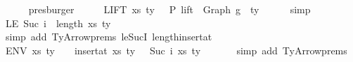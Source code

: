 \begin{isabellebody}
\ \ \ \ \isamarkupfalse%
\ presburger\isanewline
\ \ \isamarkupfalse%
\ \isamarkupfalse%
\ LIFT{\isacharcolon}{\kern0pt}\ {\isachardoublequoteopen}{\isacharparenleft}{\kern0pt}xs{\isacharprime}{\kern0pt}{\isacharcomma}{\kern0pt}\ ty{}{\isacharprime}{\kern0pt}{\isacharparenright}{\kern0pt}\ {\isacharhash}{\kern0pt}\ {\isasymGamma}{}\ {\isasymturnstile}{\isacharbraceleft}{\kern0pt}P{\isacharbraceright}{\kern0pt}\ {\isacharparenleft}{\kern0pt}lift\ {}\ {\isacharparenleft}{\kern0pt}Graph\ g{}{\isacharparenright}{\kern0pt}{\isacharparenright}{\kern0pt}\ {\isacharcolon}{\kern0pt}\ ty{}{\isachardoublequoteclose}\isanewline
\ \ \ \ \isamarkupfalse%
\ simp\isanewline
\isanewline
\ \ \isamarkupfalse%
\ LE{\isacharcolon}{\kern0pt}\ {\isachardoublequoteopen}Suc\ i\ {\isasymle}\ length\ {\isacharparenleft}{\kern0pt}{\isacharparenleft}{\kern0pt}xs{\isacharprime}{\kern0pt}{\isacharcomma}{\kern0pt}\ ty{}{\isacharprime}{\kern0pt}{\isacharparenright}{\kern0pt}\ {\isacharhash}{\kern0pt}\ {\isasymGamma}{}{\isacharparenright}{\kern0pt}{\isachardoublequoteclose}\isanewline
\ \ \ \ \ \isamarkupfalse%
\ {\isacharparenleft}{\kern0pt}simp\ add{\isacharcolon}{\kern0pt}\ TyArrow{\isachardot}{\kern0pt}prems{\isacharparenleft}{\kern0pt}{}{\isacharcomma}{\kern0pt}{}{\isacharparenright}{\kern0pt}\ le{\isacharunderscore}{\kern0pt}SucI\ length{\isacharunderscore}{\kern0pt}insert{\isacharunderscore}{\kern0pt}at{\isacharparenright}{\kern0pt}\isanewline
\ \ \isamarkupfalse%
\ ENV{\isacharcolon}{\kern0pt}\ {\isachardoublequoteopen}{\isacharparenleft}{\kern0pt}xs{\isacharprime}{\kern0pt}{\isacharcomma}{\kern0pt}\ ty{}{\isacharprime}{\kern0pt}{\isacharparenright}{\kern0pt}\ {\isacharhash}{\kern0pt}\ {\isasymGamma}{\isacharprime}{\kern0pt}\ {\isacharequal}{\kern0pt}\ insert{\isacharunderscore}{\kern0pt}at\ {\isacharparenleft}{\kern0pt}{\isacharparenleft}{\kern0pt}xs{\isacharprime}{\kern0pt}{\isacharcomma}{\kern0pt}\ ty{}{\isacharprime}{\kern0pt}{\isacharparenright}{\kern0pt}\ {\isacharhash}{\kern0pt}\ {\isasymGamma}{}{\isacharparenright}{\kern0pt}\ {\isacharparenleft}{\kern0pt}Suc\ i{\isacharparenright}{\kern0pt}\ {\isacharparenleft}{\kern0pt}xs{\isacharcomma}{\kern0pt}\ ty{}{\isacharparenright}{\kern0pt}{\isachardoublequoteclose}\isanewline
\ \ \ \ \ \isamarkupfalse%
\ {\isacharparenleft}{\kern0pt}simp\ add{\isacharcolon}{\kern0pt}\ TyArrow{\isachardot}{\kern0pt}prems{\isacharparenleft}{\kern0pt}{}{\isacharparenright}{\kern0pt}{\isacharparenright}{\kern0pt}\isanewline

\end{isabellebody}
